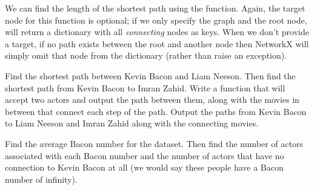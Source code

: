 We can find the length of the shortest path using the 
function. Again, the target node for this function is optional; if we only
specify the graph and the root node,  will return a dictionary
with all \emph{connecting} nodes as keys. When we don't provide a target, if no path exists between the root
and another node then NetworkX will simply omit that node from the dictionary (rather than raise an exception).

\begin{problem}
Find the shortest path between Kevin Bacon and Liam Neeson. Then find the shortest path from Kevin Bacon to Imran Zahid. Write a function that will accept two actors and output
the path between them, along with the movies in between that connect each step of the path. Output the paths from Kevin Bacon to Liam Neeson and Imran Zahid along with the connecting movies.
\end{problem}

\begin{problem}
Find the average Bacon number for the dataset. Then find the number of actors
associated with each Bacon number and the number of actors that have no connection
 to Kevin Bacon at all (we would say these people have a Bacon number of infinity).
\end{problem}

